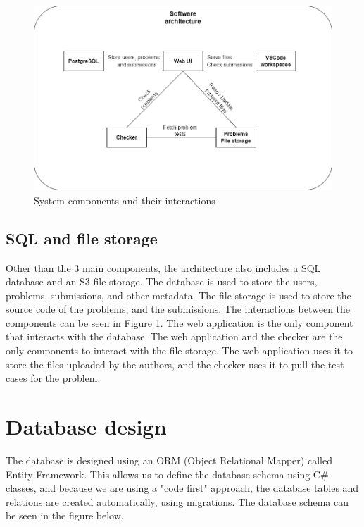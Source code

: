 \documentclass[12pt,a4paper]{report}
\begin{document}
\begin{figure}[h]
	\centering
	\includegraphics[width=\linewidth]{../photos/software-architecture.png}
	\caption{System components and their interactions}
	\label{fig:system-components}
\end{figure}

\subsection{SQL and file storage}
Other than the 3 main components, the architecture also includes a SQL database and an S3 file storage. The database is used to store the users, problems, submissions, and other metadata. The file storage is used to store the source code of the problems, and the submissions. The interactions between the components can be seen in Figure \ref{fig:system-components}. The web application is the only component that interacts with the database. The web application and the checker are the only components to interact with the file storage. The web application uses it to store the files uploaded by the authors, and the checker uses it to pull the test cases for the problem.


\section{Database design}
The database is designed using an ORM (Object Relational Mapper) called Entity Framework. This allows us to define the database schema using C\# classes, and because we are using a "code first" approach, the database tables and relations are created automatically, using migrations. The database schema can be seen in the figure below. 
\end{document}

